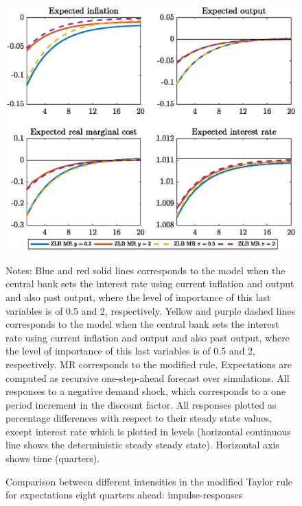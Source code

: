 \documentclass[11pt]{article}
\numberwithin{equation}{section}
\begin{document}
\begin{figure}[H]
	\centering
	\caption{Comparison between different intensities in the modified Taylor rule for expectations eight quarters ahead: impulse-responses}\label{fig:irfCompDegreeExp8_pref}
	\includegraphics[scale=.6]{irfCompDegreeExp8_pref}
	\begin{minipage}{\linewidth}
    	\vspace{1mm}
	\footnotesize{{\sc Notes:} Blue and red solid lines corresponds to the model when the central bank sets the interest rate using current inflation and output and also past output, where the level of importance of this last variables is of 0.5 and 2, respectively. Yellow and purple dashed lines corresponds to the model when the central bank sets the interest rate using current inflation and output and also past output, where the level of importance of this last variables is of 0.5 and 2, respectively. MR corresponds to the modified rule. Expectations are computed as recursive one-step-ahead forecast over simulations. All responses to a negative demand shock, which corresponds to a one period increment in the discount factor. All responses plotted as percentage differences with respect to their steady state values, except interest rate which is plotted in levels (horizontal continuous line shows the deterministic steady steady state). Horizontal axis shows time (quarters).}
	\end{minipage}
\end{figure}
\end{document}
